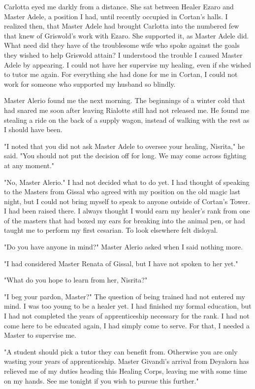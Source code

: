 \documentclass{article}
\begin{document}
Carlotta eyed me darkly from a distance. She sat between Healer Ezaro and Master Adele, a position I had, until recently occupied in Cortan's halls. I realized then, that Master Adele had brought Carlotta into the numbered few that knew of Griswold's work with Ezaro. She supported it, as Master Adele did. What need did they have of the troublesome wife who spoke against the goals they wished to help Griswold attain? I understood the trouble I caused Master Adele by appearing. I could not have her supervise my healing, even if she wished to tutor me again. For everything she had done for me in Cortan, I could not work for someone who supported my husband so blindly.

Master Alerio found me the next morning. The beginnings of a winter cold that had snared me soon after leaving Rialotte still had not released me. He found me stealing a ride on the back of a supply wagon, instead of walking with the rest as I should have been. 

"I noted that you did not ask Master Adele to oversee your healing, Nisrita," he said. "You should not put the decision off for long. We may come across fighting at any moment."

"No, Master Alerio." I had not decided what to do yet. I had thought of speaking to the Masters from Gissal who agreed with my position on the old magic last night, but I could not bring myself to speak to anyone outside of Cortan's Tower. I had been raised there. I always thought I would earn my healer's rank from one of the masters that had boxed my ears for breaking into the animal pen, or had taught me to perform my first cesarian. To look elsewhere felt disloyal. 

"Do you have anyone in mind?" Master Alerio asked when I said nothing more.

"I had considered Master Renata of Gissal, but I have not spoken to her yet."

"What do you hope to learn from her, Nisrita?"

"I beg your pardon, Master?" The question of being trained had not entered my mind. I was too young to be a healer yet. I had finished my formal education, but I had not completed the years of apprenticeship necessary for the rank. I had not come here to be educated again, I had simply come to serve. For that, I needed a Master to supervise me.

"A student should pick a tutor they can benefit from. Otherwise you are only wasting your years of apprenticeship. Master Givandi's arrival from Deyalorn has relieved me of my duties heading this Healing Corps, leaving me with some time on my hands. See me tonight if you wish to pursue this further."
\end{document}

